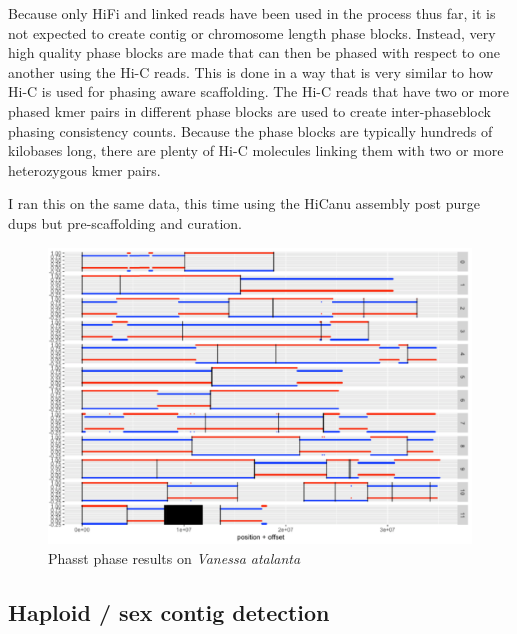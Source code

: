 {\par{
Because only HiFi and linked reads have been used in the process thus far, it is not expected to create contig or chromosome length phase blocks. Instead, very high quality phase blocks are made that  can then be phased with respect to one another using the Hi-C reads. This is done in a way that is very similar to how Hi-C is used for phasing aware scaffolding. The Hi-C reads that have two or more phased kmer pairs in different phase blocks are used to create inter-phaseblock phasing consistency counts. Because the phase blocks are typically hundreds of kilobases long, there are plenty of Hi-C molecules linking them with two or more heterozygous kmer pairs.
} 

\par{
I ran this on the same data, this time using the HiCanu assembly post purge dups but pre-scaffolding and curation.
}


\begin{figure}[htbp!]
\caption{Phasst phase results on \textit{Vanessa atalanta}}
\label{figure:phasstphase}
\begin{centering}
\includegraphics[width=\textwidth]{phasstphase.png}
\end{centering}
\end{figure}

\subsection{Haploid / sex contig detection}

}
